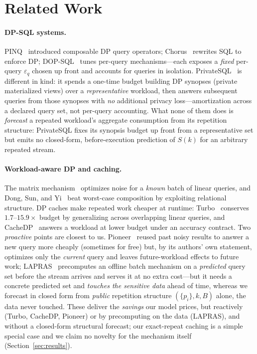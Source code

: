 \documentclass[sigconf,nonacm]{acmart}
\newcommand{\eps}{\varepsilon}
\begin{document}
\section{Related Work}
\label{sec:related}

\paragraph{DP-SQL systems.}
PINQ~\cite{mcsherry2009privacy} introduced composable DP query operators; Chorus~\cite{johnson2020chorus} rewrites SQL to enforce DP; DOP-SQL~\cite{yu2024dopsql} tunes per-query mechanisms---each exposes a \emph{fixed} per-query $\eps_q$ chosen up front and accounts for queries in isolation. PrivateSQL~\cite{kotsogiannis2019privatesql} is different in kind: it spends a one-time budget building DP synopses (private materialized views) over a \emph{representative} workload, then answers subsequent queries from those synopses with \emph{no} additional privacy loss---amortization across a declared query set, not per-query accounting. What none of them does is \emph{forecast} a repeated workload's aggregate consumption from its repetition structure: PrivateSQL fixes its synopsis budget up front from a representative set but emits no closed-form, before-execution prediction of $S(k)$ for an arbitrary repeated stream.

\paragraph{Workload-aware DP and caching.}
The matrix mechanism~\cite{li2015matrix} optimizes noise for a \emph{known} batch of linear queries, and Dong, Sun, and Yi~\cite{dong2023better} beat worst-case composition by exploiting relational structure. DP caches make repeated work cheaper at runtime: Turbo~\cite{kostopoulou2023turbo} conserves $1.7$--$15.9\times$ budget by generalizing across overlapping linear queries, and CacheDP~\cite{mazmudar2023cachedp} answers a workload at lower budget under an accuracy contract. Two \emph{proactive} points are closest to us. Pioneer~\cite{peng2013pioneer} reused past noisy results to answer a new query more cheaply (sometimes for free) but, by its authors' own statement, optimizes only the \emph{current} query and leaves future-workload effects to future work; LAPRAS~\cite{mundra2026lapras} precomputes an offline batch mechanism on a \emph{predicted} query set before the stream arrives and serves it at no extra cost---but it needs a concrete predicted set and \emph{touches the sensitive data} ahead of time, whereas we forecast in closed form from \emph{public} repetition structure $(\{p_i\},k,B)$ alone, the data never touched. These deliver the \emph{savings} our model prices, but reactively (Turbo, CacheDP, Pioneer) or by precomputing on the data (LAPRAS), and without a closed-form structural forecast; our exact-repeat caching is a simple special case and we claim no novelty for the mechanism itself (Section~\ref{sec:results}).
\end{document}
